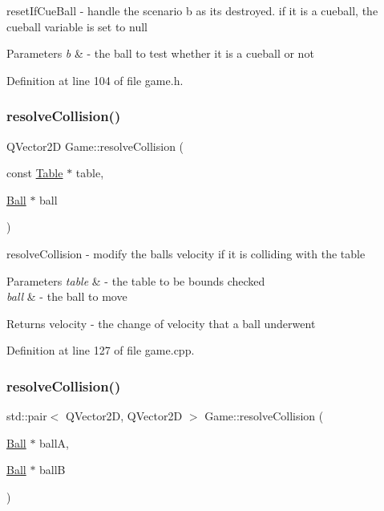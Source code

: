reset\+If\+Cue\+Ball -\/ handle the scenario b as its destroyed. if it is a cueball, the cueball variable is set to null 


\begin{DoxyParams}{Parameters}
{\em b} & -\/ the ball to test whether it is a cueball or not \\
\hline
\end{DoxyParams}


Definition at line 104 of file game.\+h.

\mbox{\label{class_game_a8063ed6374c6bbadad0cbe71364fe764}} 
\subsubsection{\texorpdfstring{resolve\+Collision()}{resolveCollision()}\hspace{0.1cm}{\footnotesize\ttfamily [1/2]}}
{\footnotesize\ttfamily Q\+Vector2D Game\+::resolve\+Collision (\begin{DoxyParamCaption}\item[{const \mbox{\hyperlink{class_table}{Table}} $\ast$}]{table,  }\item[{\mbox{\hyperlink{class_ball}{Ball}} $\ast$}]{ball }\end{DoxyParamCaption})}



resolve\+Collision -\/ modify the ball\textquotesingle{}s velocity if it is colliding with the table 


\begin{DoxyParams}{Parameters}
{\em table} & -\/ the table to be bounds checked \\
\hline
{\em ball} & -\/ the ball to move \\
\hline
\end{DoxyParams}
\begin{DoxyReturn}{Returns}
velocity -\/ the change of velocity that a ball underwent 
\end{DoxyReturn}


Definition at line 127 of file game.\+cpp.

\mbox{\label{class_game_ac7de6f8d4a2131befbf6dbcccb6921f1}} 
\subsubsection{\texorpdfstring{resolve\+Collision()}{resolveCollision()}\hspace{0.1cm}{\footnotesize\ttfamily [2/2]}}
{\footnotesize\ttfamily std\+::pair$<$ Q\+Vector2D, Q\+Vector2D $>$ Game\+::resolve\+Collision (\begin{DoxyParamCaption}\item[{\mbox{\hyperlink{class_ball}{Ball}} $\ast$}]{ballA,  }\item[{\mbox{\hyperlink{class_ball}{Ball}} $\ast$}]{ballB }\end{DoxyParamCaption})}



